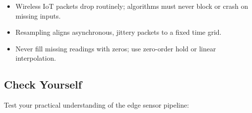 \begin{takeaways}
\begin{itemize}
    \item Wireless IoT packets drop routinely; algorithms must never block or crash on missing inputs.
    \item Resampling aligns asynchronous, jittery packets to a fixed time grid.
    \item Never fill missing readings with zeros; use zero-order hold or linear interpolation.
\end{itemize}
\end{takeaways}

\subsection{Check Yourself}

Test your practical understanding of the edge sensor pipeline:

